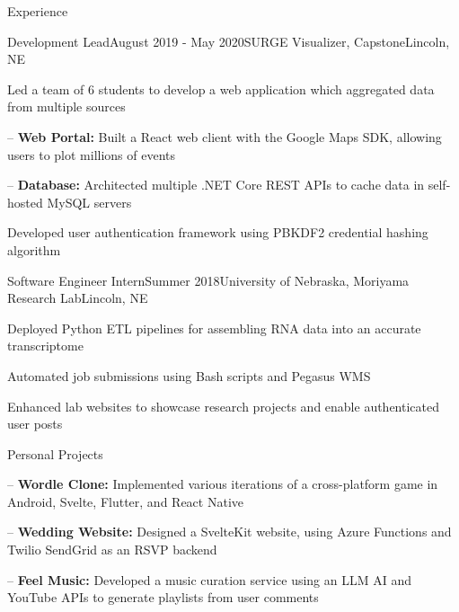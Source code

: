 \documentclass[
	10pt, %
]{article} %
\begin{document}
\begin{rSection}{Experience}
	\begin{rSubsection}{Development Lead}{August 2019 - May 2020}{SURGE Visualizer, Capstone}{Lincoln, NE}
		\item[] Led a team of 6 students to develop a web application which aggregated data from multiple sources
		\item[--] \textbf{Web Portal:} Built a React web client with the Google Maps SDK, allowing users to plot millions of events
		\item[--] \textbf{Database:} Architected multiple .NET Core REST APIs to cache data in self-hosted MySQL servers
		\item Developed user authentication framework using PBKDF2 credential hashing algorithm
	\end{rSubsection}

	\begin{rSubsection}{Software Engineer Intern}{Summer 2018}{University of Nebraska, Moriyama Research Lab}{Lincoln, NE}
		\item Deployed Python ETL pipelines for assembling RNA data into an accurate transcriptome
		\item Automated job submissions using Bash scripts and Pegasus WMS
		\item Enhanced lab websites to showcase research projects and enable authenticated user posts
	\end{rSubsection}

\end{rSection}

\begin{rSection}{Personal Projects}

	\begin{rSubsection}{}{}{}{}
		\item[--] \textbf{Wordle Clone:} Implemented various iterations of a cross-platform game in Android, Svelte, Flutter, and React Native
	\end{rSubsection}

	\begin{rSubsection}{}{}{}{}
		\item[--] \textbf{Wedding Website:} Designed a SvelteKit website, using Azure Functions and Twilio SendGrid as an RSVP backend
	\end{rSubsection}

	\begin{rSubsection}{}{}{}{}
		\item[--] \textbf{Feel Music:} Developed a music curation service using an LLM AI and YouTube APIs to generate playlists from user comments
	\end{rSubsection}

\end{rSection}
\end{document}
